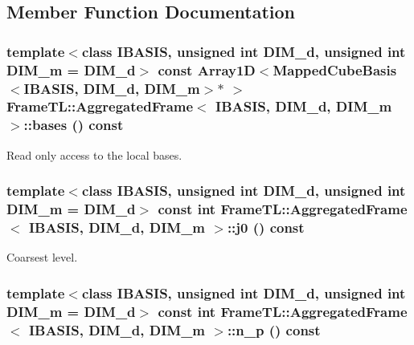 \subsection{Member Function Documentation}
\hypertarget{classFrameTL_1_1AggregatedFrame_6d03811d3fe631364a5ab927425c466e}{
\subsubsection[bases]{\setlength{\rightskip}{0pt plus 5cm}template$<$class IBASIS, unsigned int DIM\_\-d, unsigned int DIM\_\-m = DIM\_\-d$>$ const Array1D$<$MappedCubeBasis$<$IBASIS, DIM\_\-d, DIM\_\-m$>$$\ast$ $>$ {\bf FrameTL::AggregatedFrame}$<$ IBASIS, DIM\_\-d, DIM\_\-m $>$::bases () const}}
\label{classFrameTL_1_1AggregatedFrame_6d03811d3fe631364a5ab927425c466e}


Read only access to the local bases. \hypertarget{classFrameTL_1_1AggregatedFrame_546c96ce6177bacf02fb7bb9b2233d61}{
\subsubsection[j0]{\setlength{\rightskip}{0pt plus 5cm}template$<$class IBASIS, unsigned int DIM\_\-d, unsigned int DIM\_\-m = DIM\_\-d$>$ const int {\bf FrameTL::AggregatedFrame}$<$ IBASIS, DIM\_\-d, DIM\_\-m $>$::j0 () const}}
\label{classFrameTL_1_1AggregatedFrame_546c96ce6177bacf02fb7bb9b2233d61}


Coarsest level. \hypertarget{classFrameTL_1_1AggregatedFrame_ca10ffd2b65d7e93c73f8acf4e158a64}{
\subsubsection[n\_\-p]{\setlength{\rightskip}{0pt plus 5cm}template$<$class IBASIS, unsigned int DIM\_\-d, unsigned int DIM\_\-m = DIM\_\-d$>$ const int {\bf FrameTL::AggregatedFrame}$<$ IBASIS, DIM\_\-d, DIM\_\-m $>$::n\_\-p () const}}
\label{classFrameTL_1_1AggregatedFrame_ca10ffd2b65d7e93c73f8acf4e158a64}


